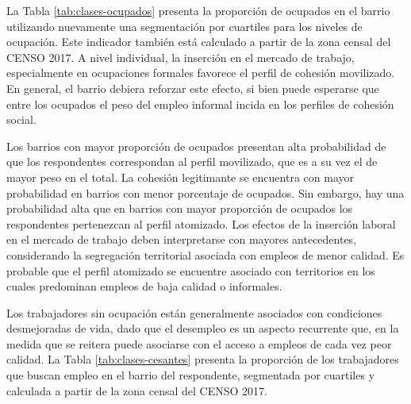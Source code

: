 \documentclass[
  12pt,
]{book}
\begin{document}
La Tabla \ref{tab:clases-ocupados} presenta la proporción de ocupados en el barrio utilizando nuevamente una segmentación por cuartiles para los niveles de ocupación. Este indicador también está calculado a partir de la zona censal del CENSO 2017. A nivel individual, la inserción en el mercado de trabajo, especialmente en ocupaciones formales favorece el perfil de cohesión movilizado. En general, el barrio debiera reforzar este efecto, si bien puede esperarse que entre los ocupados el peso del empleo informal incida en los perfiles de cohesión social.

\begin{table}

\caption{\label{tab:clases-ocupados}Efecto de la proporción de trabajadores ocupados sobre los perfiles de cohesion social}
\centering
{}
\end{table}

Los barrios con mayor proporción de ocupados presentan alta probabilidad de que los respondentes correspondan al perfil movilizado, que es a su vez el de mayor peso en el total. La cohesión legitimante se encuentra con mayor probabilidad en barrios con menor porcentaje de ocupados. Sin embargo, hay una probabilidad alta que en barrios con mayor proporción de ocupados los respondentes pertenezcan al perfil atomizado. Los efectos de la inserción laboral en el mercado de trabajo deben interpretarse con mayores antecedentes, considerando la segregación territorial asociada con empleos de menor calidad. Es probable que el perfil atomizado se encuentre asociado con territorios en los cuales predominan empleos de baja calidad o informales.

Los trabajadores sin ocupación están generalmente asociados con condiciones desmejoradas de vida, dado que el desempleo es un aspecto recurrente que, en la medida que se reitera puede asociarse con el acceso a empleos de cada vez peor calidad. La Tabla \ref{tab:clases-cesantes} presenta la proporción de los trabajadores que buscan empleo en el barrio del respondente, segmentada por cuartiles y calculada a partir de la zona censal del CENSO 2017.
\end{document}
